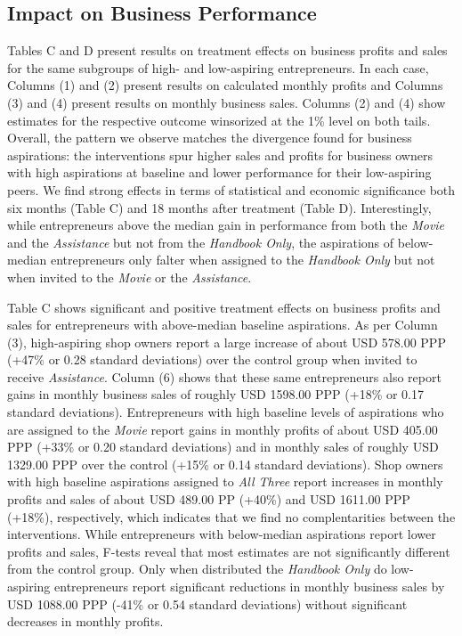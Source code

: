 \documentclass[11.5pt]{article}
\begin{document}
\subsection{Impact on Business Performance}

Tables C and D present results on treatment effects on business profits and sales for the same subgroups of high- and low-aspiring entrepreneurs. In each case, Columns (1) and (2) present results on calculated monthly profits and Columns (3) and (4) present results on monthly business sales. Columns (2) and (4) show estimates for the respective outcome winsorized at the 1\% level on both tails. Overall, the pattern we observe matches the divergence found for business aspirations: the interventions spur higher sales and profits for business owners with high aspirations at baseline and lower performance for their low-aspiring peers. We find strong effects in terms of statistical and economic significance both six months (Table C) and 18 months after treatment (Table D). Interestingly, while entrepreneurs above the median gain in performance from both the \emph{Movie} and the \emph{Assistance} but not from the \emph{Handbook Only}, the aspirations of below-median entrepreneurs only falter when assigned to the \emph{Handbook Only} but not when invited to the \emph{Movie} or the \emph{Assistance}.

Table C shows significant and positive treatment effects on business profits and sales for entrepreneurs with above-median baseline aspirations. As per Column (3), high-aspiring shop owners report a large increase of about USD 578.00 PPP (+47\% or 0.28 standard deviations) over the control group when invited to receive \emph{Assistance}. Column (6) shows that these same entrepreneurs also report gains in monthly business sales of roughly USD 1598.00 PPP (+18\% or 0.17 standard deviations). Entrepreneurs with high baseline levels of aspirations who are assigned to the \emph{Movie} report gains in monthly profits of about USD 405.00 PPP (+33\% or 0.20 standard deviations) and in monthly sales of roughly USD 1329.00 PPP over the control (+15\% or 0.14 standard deviations). Shop owners with high baseline aspirations assigned to \emph{All Three} report increases in monthly profits and sales of about USD 489.00 PP (+40\%) and USD 1611.00 PPP (+18\%), respectively, which indicates that we find no complentarities between the interventions. While entrepreneurs with below-median aspirations report lower profits and sales, F-tests reveal that most estimates are not significantly different from the control group. Only when distributed the \emph{Handbook Only} do low-aspiring entrepreneurs report significant reductions in monthly business sales by USD 1088.00 PPP (-41\% or 0.54 standard deviations) without significant decreases in monthly profits.
\end{document}

